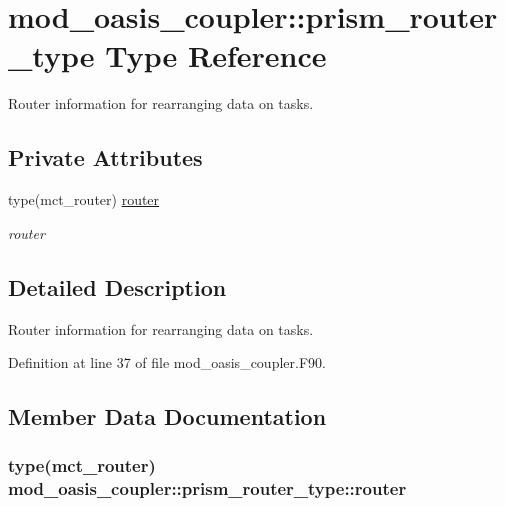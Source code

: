 \hypertarget{structmod__oasis__coupler_1_1prism__router__type}{\section{mod\+\_\+oasis\+\_\+coupler\+:\+:prism\+\_\+router\+\_\+type Type Reference}
\label{structmod__oasis__coupler_1_1prism__router__type}
}


Router information for rearranging data on tasks.  


\subsection*{Private Attributes}
\begin{DoxyCompactItemize}
\item 
type(mct\+\_\+router) \hyperlink{structmod__oasis__coupler_1_1prism__router__type_aa898a44729c7578ab3b30f0826025f45}{router}
\begin{DoxyCompactList}\small\item\em router \end{DoxyCompactList}\end{DoxyCompactItemize}


\subsection{Detailed Description}
Router information for rearranging data on tasks. 

Definition at line 37 of file mod\+\_\+oasis\+\_\+coupler.\+F90.



\subsection{Member Data Documentation}
\hypertarget{structmod__oasis__coupler_1_1prism__router__type_aa898a44729c7578ab3b30f0826025f45}{
\subsubsection[{router}]{\setlength{\rightskip}{0pt plus 5cm}type(mct\+\_\+router) mod\+\_\+oasis\+\_\+coupler\+::prism\+\_\+router\+\_\+type\+::router\hspace{0.3cm}{\ttfamily [private]}}}\label{structmod__oasis__coupler_1_1prism__router__type_aa898a44729c7578ab3b30f0826025f45}


